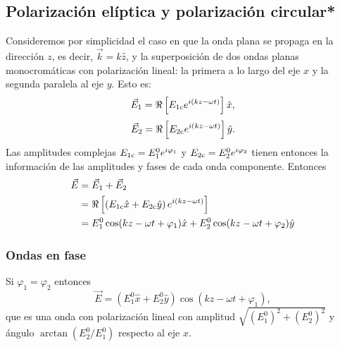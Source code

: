 \subsection{Polarización elíptica y polarización circular*}
Consideremos por simplicidad el caso en que la onda plana se propaga en la dirección $z$, es decir, $\vec{k}=k\hat{z}$, y la superposición de dos ondas planas monocromáticas con polarización lineal: la primera a lo largo del eje $x$ y la segunda paralela al eje $y$. Esto es:
\begin{equation}
\vec{E}_1=\Re\left[E_{1\rm c} e^{i(kz-\omega t)}\right]\hat{x},
\end{equation}
\begin{equation}
\vec{E}_2=\Re\left[E_{2\rm c} e^{i(kz-\omega t)}\right]\hat{y}.
\end{equation}
Las amplitudes complejas $E_{1\rm c}=E_{1}^0e^{i\varphi_1}$ y $E_{2\rm c}=E_{2}^0e^{i\varphi_2}$ tienen entonces la información de las amplitudes y fases de cada onda componente. Entonces
\begin{align}
\vec{E} &= \vec{E}_1+\vec{E}_2 \\
&= \Re\left[\left(E_{1\rm c}\hat{x}+E_{2\rm c}\hat{y}\right) e^{i(kz-\omega t)}\right] \label{E12-2} \\
&= E_{1}^0\cos(kz-\omega t+\varphi_1)\hat{x} + E_{2}^0\cos(kz-\omega t+\varphi_2)\hat{y}
\end{align}

\subsubsection{Ondas en fase}
 Si $\varphi_1=\varphi_2$ entonces
\begin{equation}
\vec{E} = (E_{1}^0\hat{x}+E_{2}^0\hat{y})\cos(kz-\omega t+\varphi_1),
\end{equation}
que es una onda con polarización lineal con amplitud $\sqrt{(E_{1}^0)^2+(E_{2}^0)^2}$ y ángulo $\arctan(E_{2}^0/E_{1}^0)$ respecto al eje $x$.

